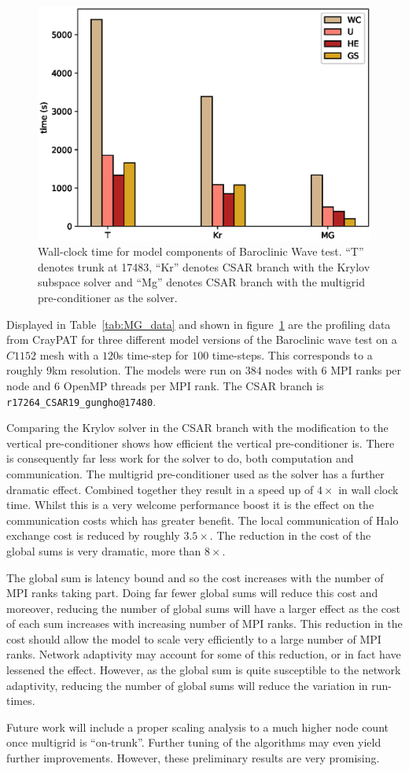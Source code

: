 \begin{figure}[ht!]
\centering\includegraphics[width=1.0\linewidth]{figs/mg-improvement.eps}
\caption{\label{fig:mg}Wall-clock time for model components of
  Baroclinic Wave test. ``T'' denotes trunk at 17483, ``Kr'' denotes
  CSAR branch with the Krylov subspace solver and ``Mg'' denotes
  CSAR branch with the multigrid pre-conditioner as the solver.}
\end{figure} 

Displayed in Table~\ref{tab:MG_data} and shown in figure~\ref{fig:mg}
are the profiling data from CrayPAT for three different model versions
of the Baroclinic wave test on a $C1152$ mesh with a $120$s time-step
for $100$ time-steps. This corresponds to a roughly 9km
resolution. The models were run on $384$ nodes with $6$ MPI ranks per
node and $6$ OpenMP threads per MPI rank.  The CSAR branch is
\verb+r17264_CSAR19_gungho@17480+.

Comparing the Krylov solver in the CSAR branch with the modification
to the vertical pre-conditioner shows how efficient the vertical
pre-conditioner is. There is consequently far less work for the solver
to do, both computation and communication. The multigrid
pre-conditioner used as the solver has a further dramatic
effect. Combined together they result in a speed up of $4 \times $ in
wall clock time. Whilst this is a very welcome performance boost it is
the effect on the communication costs which has greater benefit. The
local communication of Halo exchange cost is reduced by roughly
$3.5 \times $. The reduction in the cost of the global sums is very
dramatic, more than $8 \times$. 

The global sum is latency bound and so the cost increases with the
number of MPI ranks taking part. Doing far fewer global sums will
reduce this cost and moreover, reducing the number of global sums will
have a larger effect as the cost of each sum increases with increasing
number of MPI ranks. This reduction in the cost should
allow the model to scale very efficiently to a large number of MPI
ranks. Network adaptivity may account for some of this reduction, or
in fact have lessened the effect. However, as the global sum is quite
susceptible to the network adaptivity, reducing the number of global
sums will reduce the variation in run-times.

Future work will include a proper scaling analysis to a much higher
node count once multigrid is ``on-trunk''. Further tuning of the
algorithms may even yield further improvements. However, these
preliminary results are very promising.
 
